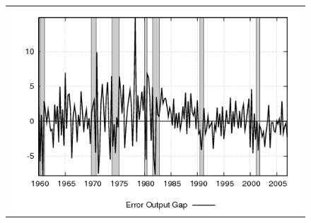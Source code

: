 \documentclass[12pt]{article}
\begin{document}
\begin{figure}[ht]
\begin{center}
\begin{tabular}{c}
\includegraphics[scale=0.5]{results_cg_wlsinit/output_err.png} 
\end{tabular}
\end{center}
\end{figure}
\end{document}
